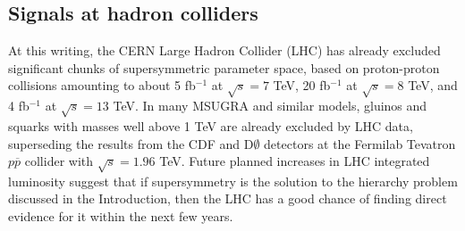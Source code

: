 \documentclass[11pt]{article}
\begin{document}
\subsection{Signals at hadron colliders}\label{subsec:signals.TEVLHC}
\setcounter{equation}{0}
\setcounter{footnote}{1}

At this writing, the CERN Large Hadron Collider (LHC) 
has already excluded significant chunks of supersymmetric parameter space,
based on proton-proton collisions amounting to about 5 fb$^{-1}$ at $\sqrt{s} = 7$ TeV,
20 fb$^{-1}$ at $\sqrt{s} = 8$ TeV, and 4 fb$^{-1}$ at $\sqrt{s} = 13$ TeV.
In many MSUGRA and similar models, gluinos and
squarks with masses well above 1 TeV are already excluded by LHC data, 
superseding the results
from the CDF and D$\emptyset$ detectors at the 
Fermilab Tevatron $p\overline p$ 
collider with $\sqrt{s} = 1.96$ TeV. 
Future planned increases in LHC integrated luminosity suggest that 
if supersymmetry is the solution to the hierarchy problem 
discussed in the Introduction, then the LHC 
has a good chance of finding direct evidence for it within the next few years.
\end{document}
